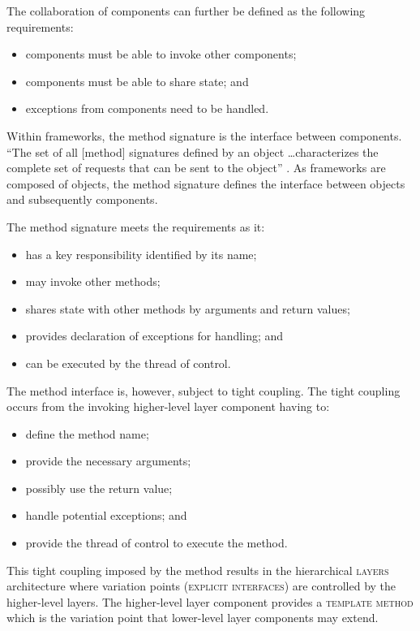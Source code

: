 \documentclass[prodmode]{style/acmlarge}
\begin{document}
The collaboration of components can further be defined as the following
requirements:
\begin{itemize}
  \item components must be able to invoke other components;
  \item components must be able to share state; and
  \item exceptions from components need to be handled.
\end{itemize}

Within frameworks, the method signature is the interface between components.
``The set of all [method] signatures defined by an object \ldots characterizes
the complete set of requests that can be sent to the object'' \cite[p. 13]{gof}.
As frameworks are composed of objects, the method signature defines the
interface between objects and subsequently components.

The method signature meets the requirements as it:
\begin{itemize}
  \item has a key responsibility identified by its name;
  \item may invoke other methods;
  \item shares state with other methods by arguments and return values;
  \item provides declaration of exceptions for handling; and
  \item can be executed by the thread of control.
\end{itemize}

The method interface is, however, subject to tight coupling.  The tight
coupling occurs from the invoking higher-level layer component having to:
\begin{itemize}
  \item define the method name;
  \item provide the necessary arguments;
  \item possibly use the return value;
  \item handle potential exceptions; and
  \item provide the thread of control to execute the method.
\end{itemize}

This tight coupling imposed by the method results in the hierarchical
\textsc{layers} architecture where variation points (\textsc{explicit
interfaces}) are controlled by the higher-level layers.  The higher-level layer
component provides a \textsc{template method} \cite{gof} which is the variation
point that lower-level layer components may extend.
\end{document}
